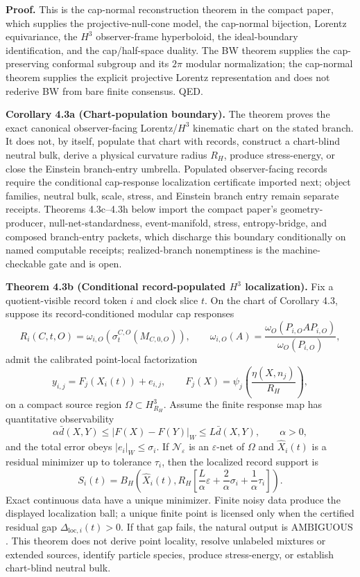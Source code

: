 \textbf{Proof.} This is the cap-normal reconstruction theorem in the compact paper, which supplies the projective-null-cone model, the cap-normal bijection, Lorentz equivariance, the \(H^3\) observer-frame hyperboloid, the ideal-boundary identification, and the cap/half-space duality. The BW theorem supplies the cap-preserving conformal subgroup and its \(2\pi\) modular normalization; the cap-normal theorem supplies the explicit projective Lorentz representation and does not rederive BW from bare finite consensus. QED.

\textbf{Corollary 4.3a (Chart-population boundary).} The theorem proves the exact canonical observer-facing Lorentz/\(H^3\) kinematic chart on the stated branch. It does not, by itself, populate that chart with records, construct a chart-blind neutral bulk, derive a physical curvature radius \(R_H\), produce stress-energy, or close the Einstein branch-entry umbrella. Populated observer-facing records require the conditional cap-response localization certificate imported next; object families, neutral bulk, scale, stress, and Einstein branch entry remain separate receipts. Theorems 4.3c--4.3h below import the compact paper's geometry-producer, null-net-standardness, event-manifold, stress, entropy-bridge, and composed branch-entry packets, which discharge this boundary conditionally on named computable receipts; realized-branch nonemptiness is the machine-checkable gate and is open.

\textbf{Theorem 4.3b (Conditional record-populated \(H^3\) localization).} Fix a quotient-visible record token \(i\) and clock slice \(t\). On the chart of Corollary 4.3, suppose its record-conditioned modular cap responses
\[
R_i(C,t,O)=\omega_{i,O}\!\left(\sigma_t^{C,O}(M_{C,0,O})\right),
\qquad
\omega_{i,O}(A)=\frac{\omega_O(P_{i,O}AP_{i,O})}{\omega_O(P_{i,O})},
\]
admit the calibrated point-local factorization
\[
y_{i,j}=F_j(X_i(t))+e_{i,j},\qquad
F_j(X)=\psi_j\!\left(\frac{\eta(X,n_j)}{R_H}\right),
\]
on a compact source region \(\Omega\subset H^3_{R_H}\). Assume the finite response map has quantitative observability
\[
\alpha \bar d(X,Y)\le |F(X)-F(Y)|_W\le L\bar d(X,Y),\qquad \alpha>0,
\]
and the total error obeys \(|e_i|_W\le\sigma_i\). If \(\mathcal N_\varepsilon\) is an \(\varepsilon\)-net of \(\Omega\) and \(\widehat X_i(t)\) is a residual minimizer up to tolerance \(\tau_i\), then the localized record support is
\[
S_i(t)=B_H\!\left(\widehat X_i(t),
R_H\left[\frac L\alpha\varepsilon+\frac2\alpha\sigma_i+\frac1\alpha\tau_i\right]\right).
\]
Exact continuous data have a unique minimizer. Finite noisy data produce the displayed localization ball; a unique finite point is licensed only when the certified residual gap \(\Delta_{\mathrm{loc},i}(t)>0\). If that gap fails, the natural output is \(\mathrm{AMBIGUOUS}\). This theorem does not derive point locality, resolve unlabeled mixtures or extended sources, identify particle species, produce stress-energy, or establish chart-blind neutral bulk.

